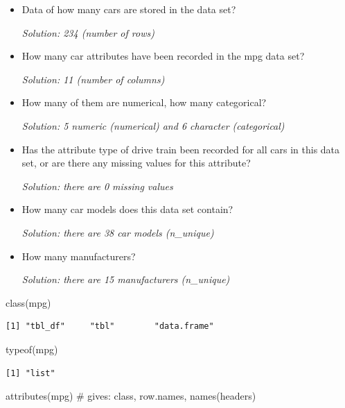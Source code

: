 \documentclass[
  letterpaper,
  DIV=11,
  numbers=noendperiod]{scrartcl}
\newenvironment{Shaded}{\begin{snugshade}}{\end{snugshade}}
\newcommand{\CommentTok}[1]{\textcolor[rgb]{0.37,0.37,0.37}{#1}}
\newcommand{\FunctionTok}[1]{\textcolor[rgb]{0.28,0.35,0.67}{#1}}
\newcommand{\NormalTok}[1]{\textcolor[rgb]{0.00,0.23,0.31}{#1}}
\begin{document}
\begin{itemize}
\item
  Data of how many cars are stored in the data set?

  \emph{Solution: 234 (number of rows)}
\item
  How many car attributes have been recorded in the mpg data set?

  \emph{Solution: 11 (number of columns)}
\item
  How many of them are numerical, how many categorical?

  \emph{Solution: 5 numeric (numerical) and 6 character (categorical)}
\item
  Has the attribute type of drive train been recorded for all cars in
  this data set, or are there any missing values for this attribute?

  \emph{Solution: there are 0 missing values}
\item
  How many car models does this data set contain?

  \emph{Solution: there are 38 car models (n\_unique)}
\item
  How many manufacturers?

  \emph{Solution: there are 15 manufacturers (n\_unique)}
\end{itemize}

\begin{Shaded}
\begin{Highlighting}[]
\FunctionTok{class}\NormalTok{(mpg)}
\end{Highlighting}
\end{Shaded}

\begin{verbatim}
[1] "tbl_df"     "tbl"        "data.frame"
\end{verbatim}

\begin{Shaded}
\begin{Highlighting}[]
\FunctionTok{typeof}\NormalTok{(mpg)}
\end{Highlighting}
\end{Shaded}

\begin{verbatim}
[1] "list"
\end{verbatim}

\begin{Shaded}
\begin{Highlighting}[]
\FunctionTok{attributes}\NormalTok{(mpg) }\CommentTok{\# gives: class, row.names, names(headers)}
\end{Highlighting}
\end{Shaded}
\end{document}
